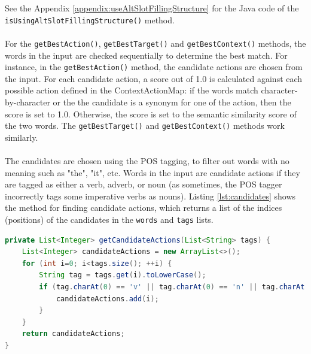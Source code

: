 \documentclass[12pt]{article}
\begin{document}
See the Appendix \ref{appendix:useAltSlotFillingStructure} for the Java code of the \texttt{isUsingAltSlotFillingStructure()} method.
\\
\\
For the \texttt{getBestAction()}, \texttt{getBestTarget()} and  \texttt{getBestContext()} methods, the words in the input are checked sequentially to determine the best match. For instance, in the \texttt{getBestAction()} method, the candidate actions are chosen from the input. For each candidate action, a score out of 1.0 is calculated against each possible action defined in the ContextActionMap: if the words match character-by-character or the the candidate is a synonym for one of the action, then the score is set to 1.0. Otherwise, the score is set to the semantic similarity score of the two words. The \texttt{getBestTarget()} and \texttt{getBestContext()} methods work similarly.
\\
\\
The candidates are chosen using the POS tagging, to filter out words with no meaning such as "the", "it", etc. Words in the input are candidate actions if they are tagged as either a verb, adverb, or noun (as sometimes, the POS tagger incorrectly tags some imperative verbs as nouns). Listing \ref{lst:candidates} shows the method for finding candidate actions, which returns a list of the indices (positions) of the candidates in the \texttt{words} and \texttt{tags} lists.
\\
\begin{lstlisting}[language=Java, caption=getCandidateActions(), label={lst:candidates}]
private List<Integer> getCandidateActions(List<String> tags) {
    List<Integer> candidateActions = new ArrayList<>();
    for (int i=0; i<tags.size(); ++i) {
        String tag = tags.get(i).toLowerCase();
        if (tag.charAt(0) == 'v' || tag.charAt(0) == 'n' || tag.charAt(0) == 'j') {
            candidateActions.add(i);
        }
    }
    return candidateActions;
}
\end{lstlisting}
\end{document}
